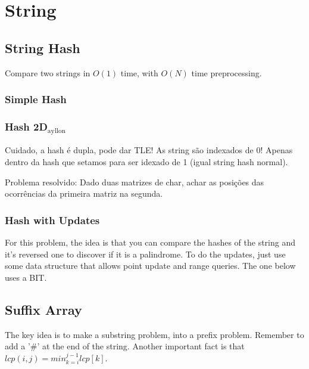 \chapter{String}
    
    \section{String Hash}
    Compare two strings in $O(1)$ time, with $O(N)$ time preprocessing.
    \subsection{Simple Hash}
    
    \subsection{Hash 2D$_{\text{ayllon}}$}
    Cuidado, a hash é dupla, pode dar TLE!
    As string são indexados de 0!
    Apenas dentro da hash que setamos para ser idexado de 1 (igual string hash normal).

    Problema resolvido: Dado duas matrizes de char, achar as posições das ocorrências da primeira matriz na segunda.
    

    \subsection{Hash with Updates}

    For this problem, the idea is that you can compare the hashes of the string and it's reversed one to discover if it is a palindrome. To do the updates, just use some data structure that allows point update and range queries. The one below uses a BIT.
    
    
    \section{Suffix Array}
    The key idea is to make a substring problem, into a prefix problem.
    Remember to add a '\#' at the end of the string.
    Another important fact is that $lcp(i,j) = min_{k=i}^{j-1} lcp[k]$.
    
